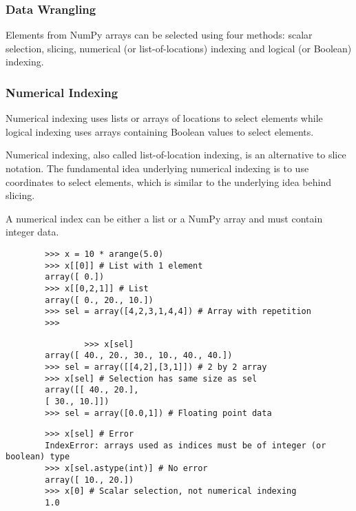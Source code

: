 \documentclass[KSmainSlides.tex]{subfiles}
\begin{document}
 
\begin{frame}
	\frametitle{Data Wrangling}
	Elements from NumPy arrays can be selected using four methods: scalar selection, slicing, numerical (or
	list-of-locations) indexing and logical (or Boolean) indexing.
	
\end{frame}
\begin{frame}[fragile]
	\frametitle{Numerical Indexing}
	Numerical indexing uses lists or arrays of locations
	to select elements while logical indexing uses arrays containing Boolean values to select elements.
	
	Numerical indexing, also called list-of-location indexing, is an alternative to slice notation. The fundamental
	idea underlying numerical indexing is to use coordinates to select elements, which is similar to
	the underlying idea behind slicing.
	
	A numerical index can be either a list or a NumPy array and must contain integer data.
\end{frame}
\begin{frame}[fragile]
	\begin{framed}
		\begin{verbatim}
		>>> x = 10 * arange(5.0)
		>>> x[[0]] # List with 1 element
		array([ 0.])
		>>> x[[0,2,1]] # List
		array([ 0., 20., 10.])
		>>> sel = array([4,2,3,1,4,4]) # Array with repetition
		>>>
		\end{verbatim}
	\end{framed}
	
\end{frame}
\begin{frame}[fragile]
	
	\begin{framed}
		\begin{verbatim}
				>>> x[sel]
		array([ 40., 20., 30., 10., 40., 40.])
		>>> sel = array([[4,2],[3,1]]) # 2 by 2 array
		>>> x[sel] # Selection has same size as sel
		array([[ 40., 20.],
		[ 30., 10.]])
		>>> sel = array([0.0,1]) # Floating point data
			\end{verbatim}
		\end{framed}
		
	\end{frame}
	\begin{frame}[fragile]
		
		\begin{framed}
			\begin{verbatim}
		>>> x[sel] # Error
		IndexError: arrays used as indices must be of integer (or boolean) type
		>>> x[sel.astype(int)] # No error
		array([ 10., 20.])
		>>> x[0] # Scalar selection, not numerical indexing
		1.0
		
		\end{verbatim}
	\end{framed}
	
\end{frame}
\end{document}
